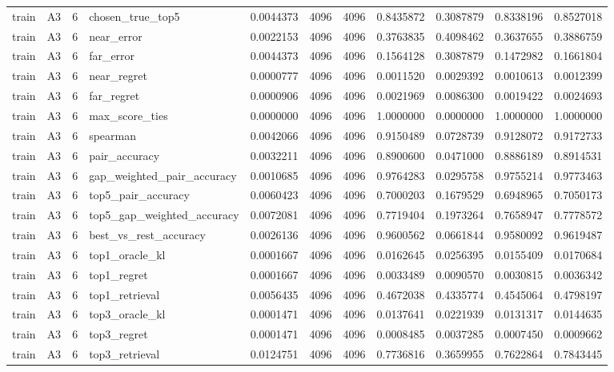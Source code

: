 \begin{tabular}{llrlrrrrrrr}
train & A3 & 6 & chosen_true_top5 & 0.0044373 & 4096 & 4096 & 0.8435872 & 0.3087879 & 0.8338196 & 0.8527018 \\
train & A3 & 6 & near_error & 0.0022153 & 4096 & 4096 & 0.3763835 & 0.4098462 & 0.3637655 & 0.3886759 \\
train & A3 & 6 & far_error & 0.0044373 & 4096 & 4096 & 0.1564128 & 0.3087879 & 0.1472982 & 0.1661804 \\
train & A3 & 6 & near_regret & 0.0000777 & 4096 & 4096 & 0.0011520 & 0.0029392 & 0.0010613 & 0.0012399 \\
train & A3 & 6 & far_regret & 0.0000906 & 4096 & 4096 & 0.0021969 & 0.0086300 & 0.0019422 & 0.0024693 \\
train & A3 & 6 & max_score_ties & 0.0000000 & 4096 & 4096 & 1.0000000 & 0.0000000 & 1.0000000 & 1.0000000 \\
train & A3 & 6 & spearman & 0.0042066 & 4096 & 4096 & 0.9150489 & 0.0728739 & 0.9128072 & 0.9172733 \\
train & A3 & 6 & pair_accuracy & 0.0032211 & 4096 & 4096 & 0.8900600 & 0.0471000 & 0.8886189 & 0.8914531 \\
train & A3 & 6 & gap_weighted_pair_accuracy & 0.0010685 & 4096 & 4096 & 0.9764283 & 0.0295758 & 0.9755214 & 0.9773463 \\
train & A3 & 6 & top5_pair_accuracy & 0.0060423 & 4096 & 4096 & 0.7000203 & 0.1679529 & 0.6948965 & 0.7050173 \\
train & A3 & 6 & top5_gap_weighted_accuracy & 0.0072081 & 4096 & 4096 & 0.7719404 & 0.1973264 & 0.7658947 & 0.7778572 \\
train & A3 & 6 & best_vs_rest_accuracy & 0.0026136 & 4096 & 4096 & 0.9600562 & 0.0661844 & 0.9580092 & 0.9619487 \\
train & A3 & 6 & top1_oracle_kl & 0.0001667 & 4096 & 4096 & 0.0162645 & 0.0256395 & 0.0155409 & 0.0170684 \\
train & A3 & 6 & top1_regret & 0.0001667 & 4096 & 4096 & 0.0033489 & 0.0090570 & 0.0030815 & 0.0036342 \\
train & A3 & 6 & top1_retrieval & 0.0056435 & 4096 & 4096 & 0.4672038 & 0.4335774 & 0.4545064 & 0.4798197 \\
train & A3 & 6 & top3_oracle_kl & 0.0001471 & 4096 & 4096 & 0.0137641 & 0.0221939 & 0.0131317 & 0.0144635 \\
train & A3 & 6 & top3_regret & 0.0001471 & 4096 & 4096 & 0.0008485 & 0.0037285 & 0.0007450 & 0.0009662 \\
train & A3 & 6 & top3_retrieval & 0.0124751 & 4096 & 4096 & 0.7736816 & 0.3659955 & 0.7622864 & 0.7843445 \\

\end{tabular}
